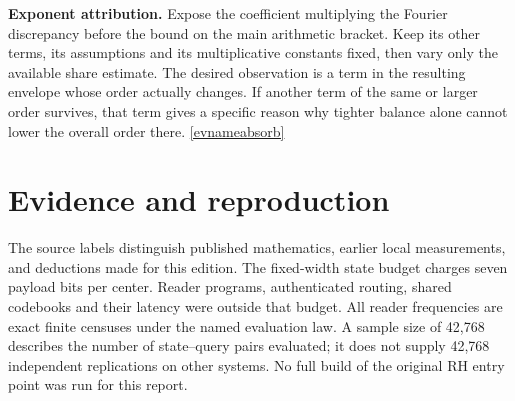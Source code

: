 \documentclass[11pt,letterpaper]{article}
\newcommand{\evref}[1]{\hyperlink{ev-#1}{\textsf{\small[\csname evname#1\endcsname]}}}
\begin{document}
\textbf{Exponent attribution.} Expose the coefficient multiplying the Fourier discrepancy before the bound on the main arithmetic bracket. Keep its other terms, its assumptions and its multiplicative constants fixed, then vary only the available share estimate. The desired observation is a term in the resulting envelope whose order actually changes. If another term of the same or larger order survives, that term gives a specific reason why tighter balance alone cannot lower the overall order there. \evref{absorb}

\section{Evidence and reproduction}
\label{sec:evidence}
The source labels distinguish published mathematics, earlier local measurements, and deductions made for this edition. The fixed-width state budget charges seven payload bits per center. Reader programs, authenticated routing, shared codebooks and their latency were outside that budget. All reader frequencies are exact finite censuses under the named evaluation law. A sample size of 42,768 describes the number of state–query pairs evaluated; it does not supply 42,768 independent replications on other systems. No full build of the original RH entry point was run for this report.
\end{document}
